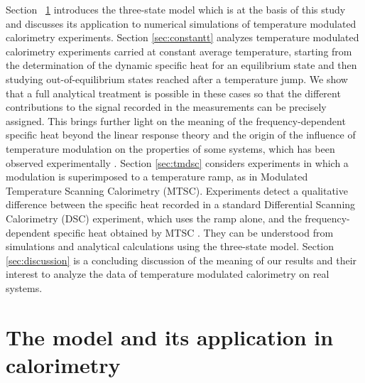 \documentclass[pre,a4paper,twocolumn,superscriptaddress,%
floatfix]{revtex4}
\begin{document}
\smallskip
Section ~\ref{sec:model} introduces the three-state model which is at the
basis of this study and discusses its application to numerical simulations of
temperature modulated calorimetry experiments. Section \ref{sec:constantt}
analyzes temperature modulated 
calorimetry experiments carried at constant average temperature, starting from
the determination of the dynamic specific heat for an equilibrium state and then
studying out-of-equilibrium states reached after a temperature jump. We show
that a full analytical treatment is possible in these cases so that the
different contributions to the signal recorded in the measurements can be
precisely assigned. This brings further light on the meaning of
the frequency-dependent specific heat beyond
the linear response theory\cite{NIELSEN}
and the origin of the influence of temperature modulation on the properties
of some systems,  which has been observed experimentally \cite{JOHARI1999}.
Section \ref{sec:tmdsc} considers experiments in which a modulation is
superimposed to a temperature ramp, as in Modulated Temperature
Scanning Calorimetry (MTSC). Experiments detect a qualitative
difference between the specific heat recorded in a standard Differential
Scanning Calorimetry (DSC) experiment, which uses the ramp alone, and the
frequency-dependent specific heat obtained by MTSC \cite{LAARRAJ}. They can
be understood from simulations and analytical calculations using
the three-state model. Section
\ref{sec:discussion} is a concluding discussion of the meaning of our results
and their interest to analyze the data of temperature modulated calorimetry on
real systems. 


\section{The model and its application in calorimetry}
\label{sec:model}
\end{document}
